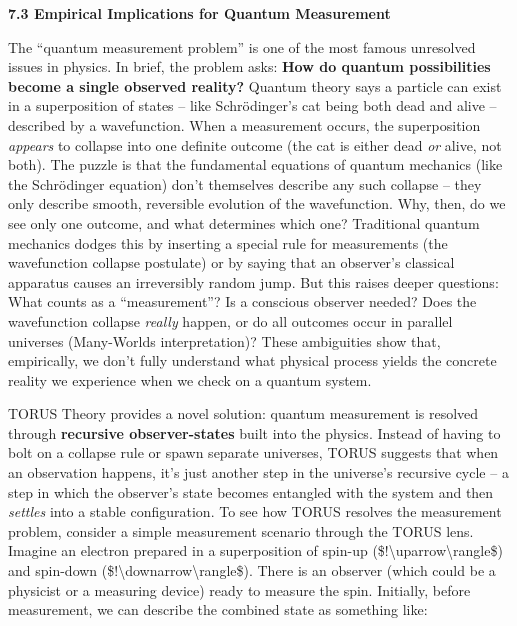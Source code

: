 \documentclass[
]{article}
\begin{document}
\textbf{7.3 Empirical Implications for Quantum Measurement}

The ``quantum measurement problem'' is one of the most famous unresolved
issues in physics. In brief, the problem asks: \textbf{How do quantum
possibilities become a single observed reality?} Quantum theory says a
particle can exist in a superposition of states -- like Schrödinger's
cat being both dead and alive -- described by a wavefunction. When a
measurement occurs, the superposition \emph{appears} to collapse into
one definite outcome (the cat is either dead \emph{or} alive, not both).
The puzzle is that the fundamental equations of quantum mechanics (like
the Schrödinger equation) don't themselves describe any such collapse --
they only describe smooth, reversible evolution of the wavefunction.
Why, then, do we see only one outcome, and what determines which one?
Traditional quantum mechanics dodges this by inserting a special rule
for measurements (the wavefunction collapse postulate) or by saying that
an observer's classical apparatus causes an irreversibly random jump.
But this raises deeper questions: What counts as a ``measurement''? Is a
conscious observer needed? Does the wavefunction collapse \emph{really}
happen, or do all outcomes occur in parallel universes (Many-Worlds
interpretation)? These ambiguities show that, empirically, we don't
fully understand what physical process yields the concrete reality we
experience when we check on a quantum system.

TORUS Theory provides a novel solution: quantum measurement is resolved
through \textbf{recursive observer-states} built into the physics.
Instead of having to bolt on a collapse rule or spawn separate
universes, TORUS suggests that when an observation happens, it's just
another step in the universe's recursive cycle -- a step in which the
observer's state becomes entangled with the system and then
\emph{settles} into a stable configuration. To see how TORUS resolves
the measurement problem, consider a simple measurement scenario through
the TORUS lens. Imagine an electron prepared in a superposition of
spin-up (\$\textbar!\textbackslash uparrow\textbackslash rangle\$) and
spin-down (\$\textbar!\textbackslash downarrow\textbackslash rangle\$).
There is an observer (which could be a physicist or a measuring device)
ready to measure the spin. Initially, before measurement, we can
describe the combined state as something like:
\end{document}
